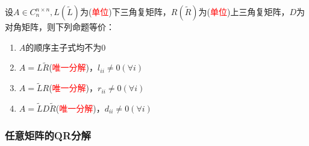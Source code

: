 \begin{theorem}
设$A\in C^{n\times n}_n, L(\tilde{L})$为(\textcolor{red}{单位})下三角复矩阵，$R(\tilde{R})$为(\textcolor{red}{单位})上三角复矩阵，$D$为对角矩阵，则下列命题等价：
\begin{enumerate}
\item $A$的顺序主子式均不为0
\item $A=L\tilde{R}$(\textcolor{red}{唯一分解})，$l_{ii}\ne0(\forall i)$
\item $A=\tilde{L}R$(\textcolor{red}{唯一分解})，$r_{ii}\ne0(\forall i)$
\item $A=\tilde{L}D\tilde{R}$(\textcolor{red}{唯一分解})，$d_{ii}\ne0(\forall i)$
\end{enumerate}
\end{theorem}

\subsubsection{任意矩阵的QR分解}

